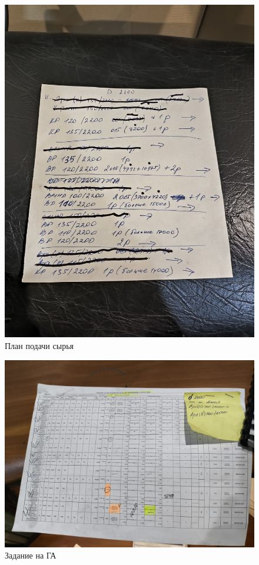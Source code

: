\newpage
\begin{figure}
\begin{center}
 \includegraphics[height=0.9\textheight, keepaspectratio]{Pics/V план для карщика.jpg}
\end{center}
 \caption{План подачи сырья}
 \label{pic:V план для карщика}
\end{figure}

\newpage
\begin{figure}
\begin{center}
 \includegraphics[height=0.4\textheight, keepaspectratio]
 {Pics/V задание с ЦУ от плановика.jpg }
\end{center}
 \caption{Задание на ГА}
 \label{pic:V задание с ЦУ от плановика}
\end{figure}

